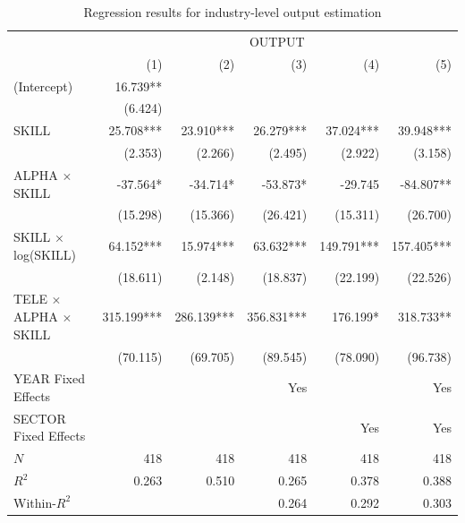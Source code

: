 \documentclass[
  11pt,
  letterpaper,
  DIV=11,
  numbers=noendperiod]{scrartcl}
\theoremstyle{plain}
\theoremstyle{remark}
\begin{document}
\begin{table}[h]  
\centering  
\fontsize{8}{10}\selectfont  
\begin{tabular}{lrrrrr}
\toprule
                                   &                   \multicolumn{5}{c}{OUTPUT}                   \\ 
\cmidrule(lr){2-6} 
                                   &        (1) &        (2) &        (3) &        (4) &        (5) \\ 
\midrule
(Intercept)                        &   16.739** &            &            &            &            \\ 
                                   &    (6.424) &            &            &            &            \\ 
SKILL                              &  25.708*** &  23.910*** &  26.279*** &  37.024*** &  39.948*** \\ 
                                   &    (2.353) &    (2.266) &    (2.495) &    (2.922) &    (3.158) \\ 
ALPHA $\times$ SKILL               &   -37.564* &   -34.714* &   -53.873* &    -29.745 &  -84.807** \\ 
                                   &   (15.298) &   (15.366) &   (26.421) &   (15.311) &   (26.700) \\ 
SKILL $\times$ log(SKILL)          &  64.152*** &  15.974*** &  63.632*** & 149.791*** & 157.405*** \\ 
                                   &   (18.611) &    (2.148) &   (18.837) &   (22.199) &   (22.526) \\ 
TELE $\times$ ALPHA $\times$ SKILL & 315.199*** & 286.139*** & 356.831*** &   176.199* &  318.733** \\ 
                                   &   (70.115) &   (69.705) &   (89.545) &   (78.090) &   (96.738) \\ 
\midrule
YEAR Fixed Effects                 &            &            &        Yes &            &        Yes \\ 
SECTOR Fixed Effects               &            &            &            &        Yes &        Yes \\ 
\midrule
$N$                                &        418 &        418 &        418 &        418 &        418 \\ 
$R^2$                              &      0.263 &      0.510 &      0.265 &      0.378 &      0.388 \\ 
Within-$R^2$                       &            &            &      0.264 &      0.292 &      0.303 \\ 
\bottomrule
\end{tabular} 
\caption{Regression results for industry-level output estimation}  
  
\end{table}
\end{document}
